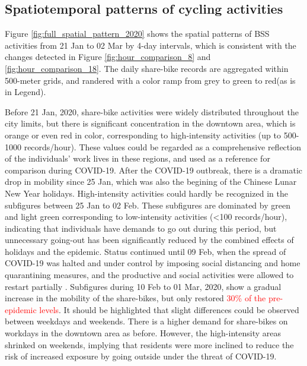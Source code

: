 \documentclass[preprints,ijgi,submit,moreauthors]{Definitions/mdpi}
\begin{document}
\subsection{Spatiotemporal patterns of cycling activities}

Figure \ref{fig:full_spatial_pattern_2020} shows the spatial patterns of BSS activities from 21 Jan to 02 Mar by 4-day intervals, which is consistent with the changes detected in Figure \ref{fig:hour_comparison_8} and \ref{fig:hour_comparison_18}.
The daily share-bike records are aggregated within 500-meter grids, and randered with a color ramp from grey to green to red(as is in Legend).

Before 21 Jan, 2020, share-bike activities were widely distributed throughout the city limits, but there is significant concentration in the downtown area, which is orange or even red in color, corresponding to high-intensity activities (up to 500-1000 records/hour).
These values could be regarded as a comprehensive reflection of the individuals' work lives in these regions, and used as a reference for comparison during COVID-19.
After the COVID-19 outbreak, there is a dramatic drop in mobility since 25 Jan, which was also the begining of the Chinese Lunar New Year holidays.
High-intensity activities could hardly be recognized in the subfigures between 25 Jan to 02 Feb. 
These subfigures are dominated by green and light green corresponding to low-intensity activities (<100 records/hour), indicating that individuals have demands to go out during this period, but unnecessary going-out has been significantly reduced by the combined effects of holidays and the epidemic.
Status continued until 09 Feb, when the spread of COVID-19 was halted and under control by imposing social distancing and home quarantining measures, and the productive and social activities were allowed to restart partially .
Subfigures during 10 Feb to 01 Mar, 2020, show a gradual increase in the mobility of the share-bikes, but only restored \textcolor{red}{30\% of the pre-epidemic levels}.
It should be highlighted that slight differences could be observed between weekdays and weekends.
There is a higher demand for share-bikes on workdays in the downtown area as before.
However, the high-intensity areas shrinked on weekends, implying that residents were more inclined to reduce the risk of increased exposure by going outside under the threat of COVID-19. 
\end{document}
